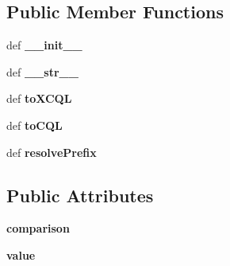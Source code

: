 \subsection*{Public Member Functions}
\begin{DoxyCompactItemize}
\item 
\hypertarget{classcheshire3_1_1cql_parser_1_1_modifier_clause_a6981fc27ad5c8c0f5d3b92248e5bfd46}{def {\bfseries \-\_\-\-\_\-init\-\_\-\-\_\-}}\label{classcheshire3_1_1cql_parser_1_1_modifier_clause_a6981fc27ad5c8c0f5d3b92248e5bfd46}

\item 
\hypertarget{classcheshire3_1_1cql_parser_1_1_modifier_clause_ade0f1fcefaffdebccc375a51f966d8a7}{def {\bfseries \-\_\-\-\_\-str\-\_\-\-\_\-}}\label{classcheshire3_1_1cql_parser_1_1_modifier_clause_ade0f1fcefaffdebccc375a51f966d8a7}

\item 
\hypertarget{classcheshire3_1_1cql_parser_1_1_modifier_clause_a84cc2b1daea5bb5ddcd138188020eb3e}{def {\bfseries to\-X\-C\-Q\-L}}\label{classcheshire3_1_1cql_parser_1_1_modifier_clause_a84cc2b1daea5bb5ddcd138188020eb3e}

\item 
\hypertarget{classcheshire3_1_1cql_parser_1_1_modifier_clause_a02d3f2578195543dba967ddeea0bfd8d}{def {\bfseries to\-C\-Q\-L}}\label{classcheshire3_1_1cql_parser_1_1_modifier_clause_a02d3f2578195543dba967ddeea0bfd8d}

\item 
\hypertarget{classcheshire3_1_1cql_parser_1_1_modifier_clause_ab2bfec05074c92df29ac96c9f5853836}{def {\bfseries resolve\-Prefix}}\label{classcheshire3_1_1cql_parser_1_1_modifier_clause_ab2bfec05074c92df29ac96c9f5853836}

\end{DoxyCompactItemize}
\subsection*{Public Attributes}
\begin{DoxyCompactItemize}
\item 
\hypertarget{classcheshire3_1_1cql_parser_1_1_modifier_clause_ad0829b068a9bd21f038208f6368fe579}{{\bfseries comparison}}\label{classcheshire3_1_1cql_parser_1_1_modifier_clause_ad0829b068a9bd21f038208f6368fe579}

\item 
\hypertarget{classcheshire3_1_1cql_parser_1_1_modifier_clause_a93eb88c958678efbb02ff24a8dff25d3}{{\bfseries value}}\label{classcheshire3_1_1cql_parser_1_1_modifier_clause_a93eb88c958678efbb02ff24a8dff25d3}

\end{DoxyCompactItemize}

